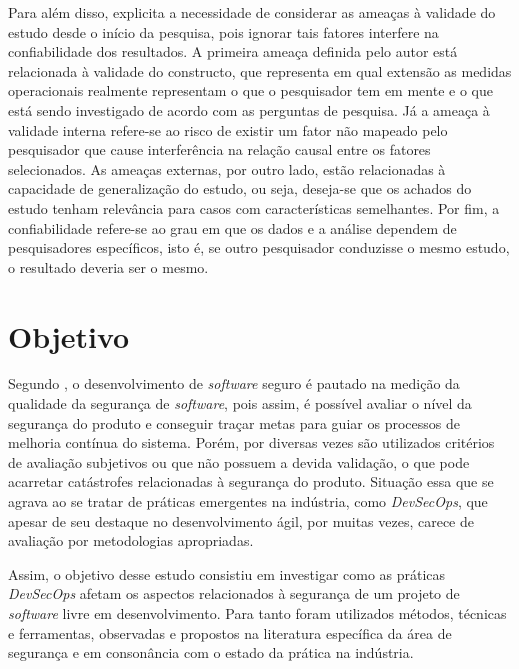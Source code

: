 Para além disso, \cite{Runeson2009} explicita a necessidade de considerar as ameaças à validade do estudo desde o início da pesquisa, pois ignorar tais fatores interfere na confiabilidade dos resultados. A primeira ameaça definida pelo autor está relacionada à validade do constructo, que representa em qual extensão as medidas operacionais realmente representam o que o pesquisador tem em mente e o que está sendo investigado de acordo com as perguntas de pesquisa. Já a ameaça à validade interna refere-se ao risco de existir um fator não mapeado pelo pesquisador que cause interferência na relação causal entre os fatores selecionados.
As ameaças externas, por outro lado, estão relacionadas à capacidade de generalização do estudo, ou seja, deseja-se que os achados do estudo tenham relevância para casos com características semelhantes. Por fim, a confiabilidade refere-se ao grau em que os dados e a análise dependem de pesquisadores específicos, isto é, se outro pesquisador conduzisse o mesmo estudo, o resultado deveria ser o mesmo.

\section{Objetivo}

Segundo , o desenvolvimento de \textit{software} seguro é pautado na medição da qualidade da segurança de \textit{software}, pois assim, é possível avaliar o nível da segurança do produto e conseguir traçar metas para guiar os processos de melhoria contínua do sistema. Porém, por diversas vezes são utilizados critérios de avaliação subjetivos ou que não possuem a devida validação, o que pode acarretar catástrofes relacionadas à segurança do produto.
Situação essa que se agrava ao se tratar de práticas emergentes na indústria, como \textit{DevSecOps}, que apesar de seu destaque no desenvolvimento ágil, por muitas vezes, carece de avaliação por metodologias apropriadas.

Assim, o objetivo desse estudo consistiu em investigar como as práticas \textit{DevSecOps} afetam os aspectos relacionados à segurança de um projeto de \textit{software} livre em desenvolvimento. Para tanto foram utilizados métodos, técnicas e ferramentas, observadas e propostos na literatura específica da área de segurança e em consonância com o estado da prática na indústria.

